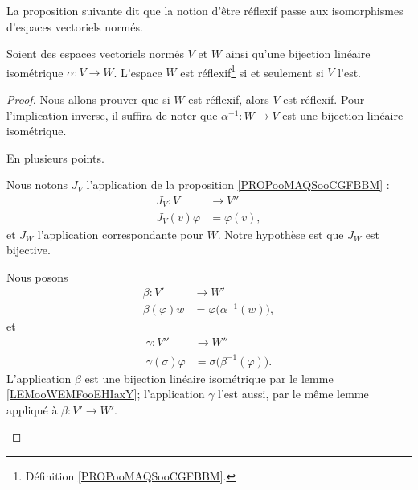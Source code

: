 La proposition suivante dit que la notion d'être réflexif passe aux isomorphismes d'espaces vectoriels normés.
\begin{proposition}      \label{PROPooVRQKooLdmajh}
Soient des espaces vectoriels normés \( V\) et \( W\) ainsi qu'une bijection linéaire isométrique \( \alpha\colon V\to W\). L'espace \( W\) est réflexif\footnote{Définition \ref{PROPooMAQSooCGFBBM}.} si et seulement si \( V\) l'est.
\end{proposition}

\begin{proof}
Nous allons prouver que si \( W\) est réflexif, alors \( V\) est réflexif. Pour l'implication inverse, il suffira de noter que \( \alpha^{-1}\colon W\to V\) est une bijection linéaire isométrique.

En plusieurs points.
\begin{subproof}
    Nous notons \( J_V\) l'application de la proposition \ref{PROPooMAQSooCGFBBM} :
    \begin{equation}
        \begin{aligned}
            J_V\colon V   & \to V''       \\
            J_V(v)\varphi & = \varphi(v),
        \end{aligned}
    \end{equation}
    et \( J_W\) l'application correspondante pour \( W\). Notre hypothèse est que \( J_W\) est bijective.

    Nous posons
    \begin{equation}
        \begin{aligned}
            \beta\colon V'  & \to W'                              \\
            \beta(\varphi)w & =\varphi\big( \alpha^{-1}(w) \big),
        \end{aligned}
    \end{equation}
    et
    \begin{equation}
        \begin{aligned}
            \gamma\colon V''      & \to W''                                 \\
            \gamma(\sigma)\varphi & =\sigma\big( \beta^{-1}(\varphi) \big).
        \end{aligned}
    \end{equation}
    L'application \( \beta\) est une bijection linéaire isométrique par le lemme \ref{LEMooWEMFooEHIaxY}; l'application \( \gamma\) l'est aussi, par le même lemme appliqué à \( \beta\colon V'\to W'\).


\end{subproof}
\end{proof}
